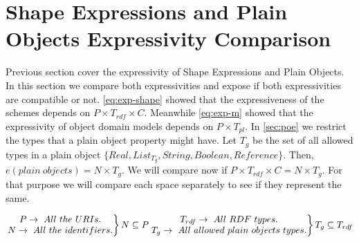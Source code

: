 \section{Shape Expressions and Plain Objects Expressivity Comparison}

Previous section cover the expressivity of Shape Expressions and Plain Objects.
In this section we compare both expressivities and expose if both expressivities
are compatible or not. \cref{eq:exp-shape} showed that the expressiveness of the
schemes depends on $P \times T_{rdf} \times C$. Meanwhile \cref{eq:exp-m} showed
that the expressivity of object domain models depends on $P \times T_{pl}$. In
\cref{sec:poe} we restrict the types that a plain object property might have.
Let $T_g$ be the set of all allowed types in a plain object $\{ Real, List_{T_g}, String, Boolean, Reference \}$.
Then, $e(plain\ objects) = N \times T_g$. We will compare now if $P \times T_{rdf} \times C = N \times T_g$.
For that purpose we will compare each space separately to see if they represent the same.

\begin{equation}\label{eq:restrict-spaces}
    \left.\begin{matrix}
        P \rightarrow\ All\ the\ URIs.
     \\ N \rightarrow\ All\ the\ identifiers.
     \end{matrix}\right\} N \subseteq P\\
     \left.\begin{matrix}
        T_{rdf} \rightarrow\ All\ RDF\ types.
     \\ T_{g} \rightarrow\ All\ allowed\ plain\ objects\ types.
     \end{matrix}\right\} T_g \subseteq T_{rdf}\\
\end{equation}

